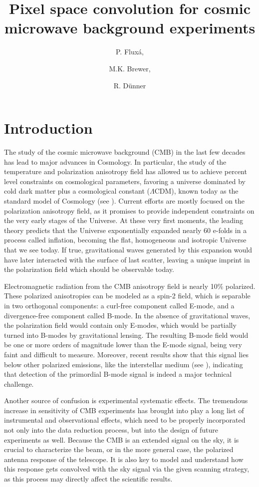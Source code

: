 \documentclass[a4paper,11pt]{article}
\title{\boldmath Pixel space convolution for cosmic microwave background experiments}
\author[a]{P. Flux\'a,}
\author[b]{M.K. Brewer,}
\author[a]{R. D\"unner}
\affiliation[a]{Instituto de Astrof\'isica, Pontificia Universidad Cat\'olica de Chile ,\\Vicu\~na Mackenna 4860, Chile}
\affiliation[b]{Department of Astronomy, Johns Hopkins University,\\Baltimore MD, USA}
\begin{document}
\maketitle
\flushbottom

\section{Introduction}

The study of the cosmic microwave background (CMB) in the last few decades has lead to major advances in Cosmology. In particular, the study of the temperature and polarization anisotropy field has allowed us to achieve percent level constraints on cosmological parameters, favoring a universe dominated by cold dark matter plus a cosmological constant ($\Lambda$CDM), known today as the standard model of Cosmology (see \cite{2016A&A...594A..12P}). Current efforts are mostly focused on the polarization anisotropy field, as it promises to provide independent constraints on the very early stages of the Universe. At these very first moments, the leading theory predicts that the Universe exponentially expanded nearly 60 e-folds in a process called inflation, becoming the flat, homogeneous and isotropic Universe that we see today. If true, gravitational waves generated by this expansion would have later interacted with the surface of last scatter, leaving a unique imprint in the polarization field which should be observable today.

Electromagnetic radiation from the CMB anisotropy field is nearly 10\% polarized. These polarized anisotropies can be modeled as a spin-2 field, which is separable in two orthogonal components: a curl-free component called E-mode, and a divergence-free component called B-mode. In the absence of gravitational waves, the polarization field would contain only E-modes, which would be partially turned into B-modes by gravitational lensing. The resulting B-mode field would be one or more orders of magnitude lower than the E-mode signal, being very faint and difficult to measure. Moreover, recent results show that this signal lies below other polarized emissions, like the interstellar medium (see \cite{2018PhRvL.121v1301B}), indicating that detection of the primordial B-mode signal is indeed a major technical challenge.

Another source of confusion is experimental systematic effects. The tremendous increase in sensitivity of CMB experiments has brought into play a long list of instrumental and observational effects, which need to be properly incorporated not only into the data reduction process, but into the design of future experiments as well. Because the CMB is an extended signal on the sky, it is crucial to characterize the beam, or in the more general case, the polarized antenna response of the telescope. It is also key to model and understand how this response gets convolved with the sky signal via the given scanning strategy, as this process may directly affect the scientific results.
\end{document}
